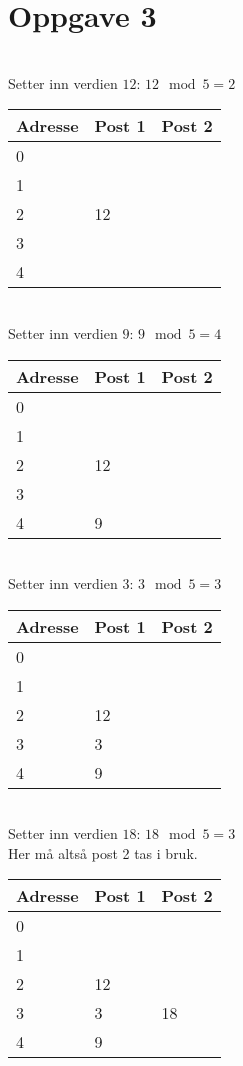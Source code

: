 \section{Oppgave 3}
~\\
Setter inn verdien $12$: $12 \mod 5 = 2$\\
\begin{tabular}{|l|l|l|}
    \hline
    Adresse & Post 1 & Post 2 \\ \hline
    0       & ~      & ~      \\ \hline
    1       & ~      & ~      \\ \hline
    2       & 12     & ~      \\ \hline
    3       & ~      & ~      \\ \hline
    4       & ~      & ~      \\ \hline
\end{tabular}

~\\
Setter inn verdien $9$: $9 \mod 5 = 4$\\
\begin{tabular}{|l|l|l|}
    \hline
    Adresse & Post 1 & Post 2 \\ \hline
    0       & ~      & ~      \\ \hline
    1       & ~      & ~      \\ \hline
    2       & 12     & ~      \\ \hline
    3       & ~      & ~      \\ \hline
    4       & 9      & ~      \\ \hline
\end{tabular}

~\\
Setter inn verdien $3$: $3 \mod 5 = 3$\\
\begin{tabular}{|l|l|l|}
    \hline
    Adresse & Post 1 & Post 2 \\ \hline
    0       & ~      & ~      \\ \hline
    1       & ~      & ~      \\ \hline
    2       & 12     & ~      \\ \hline
    3       & 3      & ~      \\ \hline
    4       & 9      & ~      \\ \hline
\end{tabular}

~\\
Setter inn verdien $18$: $18 \mod 5 = 3$\\
Her må altså post 2 tas i bruk.\\
\begin{tabular}{|l|l|l|}
    \hline
    Adresse & Post 1 & Post 2 \\ \hline
    0       & ~      & ~      \\ \hline
    1       & ~      & ~      \\ \hline
    2       & 12     & ~      \\ \hline
    3       & 3      & 18     \\ \hline
    4       & 9      & ~      \\ \hline
\end{tabular}

